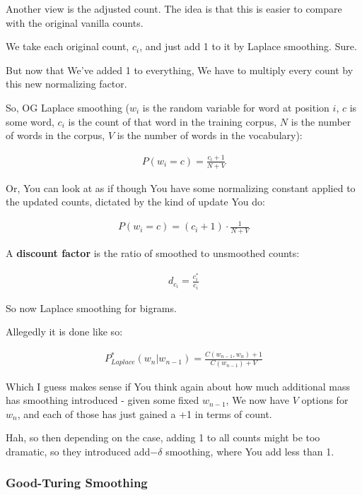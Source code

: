 \documentclass{article}
\begin{document}
			Another view is the adjusted count. The idea is that this is easier to compare with the original vanilla counts.
			
			We take each original count, $c_i$, and just add 1 to it by Laplace smoothing. Sure.
			
			But now that We've added 1 to everything, We have to multiply every count by this new normalizing factor.
			
			So, OG Laplace smoothing ($w_i$ is the random variable for word at position $i$, $c$ is some word, $c_i$ is the count of that word in the training corpus, $N$ is the number of words in the corpus, $V$ is the number of words in the vocabulary):
			
			\begin{align}
				P(w_i = c) = \frac{c_i + 1}{N + V}
			\end{align}
			
			Or, You can look at as if though You have some normalizing constant applied to the updated counts, dictated by the kind of update You do:
			
			\begin{align}
				P(w_i = c) = (c_i+1)\cdot\frac{1}{N + V}
			\end{align}
			
			A \textbf{discount factor} is the ratio of smoothed to unsmoothed counts:
			
			\begin{align}
				d_{c_i} = \frac{c^*_i}{c_i}
			\end{align}
		
			So now Laplace smoothing for bigrams.
			
			Allegedly it is done like so:
			
			\begin{align}
				P^*_{Laplace}(w_n|w_{n-1}) = \frac{C(w_{n-1}, w_n) + 1}{C(w_{n-1}) + V}
			\end{align}
		
			Which I guess makes sense if You think again about how much additional mass has smoothing introduced - given some fixed $w_{n-1}$, We now have $V$ options for $w_n$, and each of those has just gained a +1 in terms of count.
			
			Hah, so then depending on the case, adding 1 to all counts might be too dramatic, so they introduced add$-\delta$ smoothing, where You add less than 1.
			
		\subsubsection{Good-Turing Smoothing}
		
\end{document}
